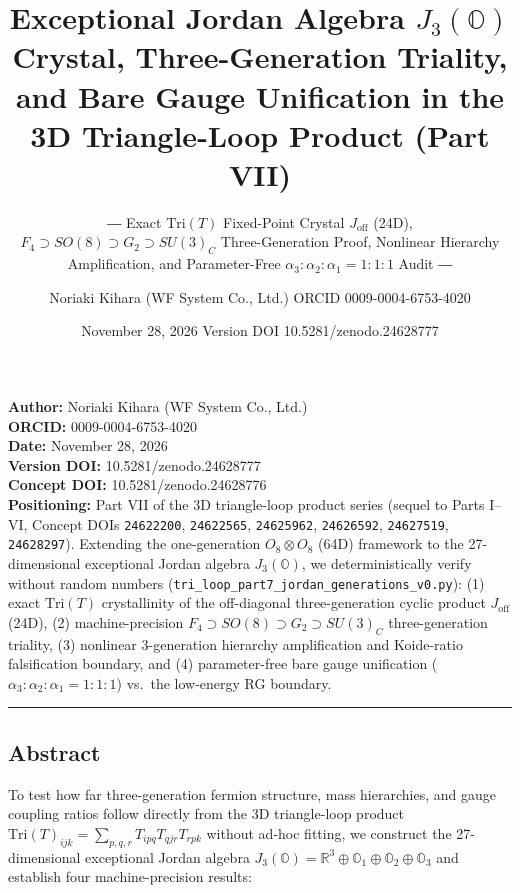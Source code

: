 \documentclass[
  a4paper,
]{article}
\title{Exceptional Jordan Algebra \(J_3(\mathbb{O})\) Crystal,
Three-Generation Triality, and Bare Gauge Unification in the 3D
Triangle-Loop Product (Part VII)}
\subtitle{― Exact \(\mathrm{Tri}(T)\) Fixed-Point Crystal
\(J_{\mathrm{off}}\) (24D),
\(F_4 \supset SO(8) \supset G_2 \supset SU(3)_C\) Three-Generation
Proof, Nonlinear Hierarchy Amplification, and Parameter-Free
\(\alpha_3:\alpha_2:\alpha_1 = 1:1:1\) Audit ―}
\author{Noriaki Kihara (WF System Co., Ltd.) ORCID 0009-0004-6753-4020}
\date{November 28, 2026 Version DOI 10.5281/zenodo.24628777}
\begin{document}
\maketitle

{
\setcounter{tocdepth}{2}
\tableofcontents
}
\textbf{Author:} Noriaki Kihara (WF System Co., Ltd.)\\
\textbf{ORCID:} 0009-0004-6753-4020\\
\textbf{Date:} November 28, 2026\\
\textbf{Version DOI:} 10.5281/zenodo.24628777\\
\textbf{Concept DOI:} 10.5281/zenodo.24628776\\
\textbf{Positioning:} Part VII of the 3D triangle-loop product series
(sequel to Parts I--VI, Concept DOIs \texttt{24622200},
\texttt{24622565}, \texttt{24625962}, \texttt{24626592},
\texttt{24627519}, \texttt{24628297}). Extending the one-generation
\(O_8 \otimes O_8\) (64D) framework to the 27-dimensional exceptional
Jordan algebra \(J_3(\mathbb{O})\), we deterministically verify without
random numbers (\texttt{tri\_loop\_part7\_jordan\_generations\_v0.py}):
(1) exact \(\mathrm{Tri}(T)\) crystallinity of the off-diagonal
three-generation cyclic product \(J_{\mathrm{off}}\) (24D), (2)
machine-precision \(F_4 \supset SO(8) \supset G_2 \supset SU(3)_C\)
three-generation triality, (3) nonlinear 3-generation hierarchy
amplification and Koide-ratio falsification boundary, and (4)
parameter-free bare gauge unification
(\(\alpha_3:\alpha_2:\alpha_1 = 1:1:1\)) vs.~the low-energy RG boundary.

\begin{center}\rule{0.5\linewidth}{0.5pt}\end{center}

\subsection{Abstract}\label{abstract}

To test how far three-generation fermion structure, mass hierarchies,
and gauge coupling ratios follow directly from the 3D triangle-loop
product \(\mathrm{Tri}(T)_{ijk} = \sum_{p,q,r} T_{ipq} T_{qjr} T_{rpk}\)
without ad-hoc fitting, we construct the 27-dimensional exceptional
Jordan algebra
\(J_3(\mathbb{O}) = \mathbb{R}^3 \oplus \mathbb{O}_1 \oplus \mathbb{O}_2 \oplus \mathbb{O}_3\)
and establish four machine-precision results:
\end{document}
